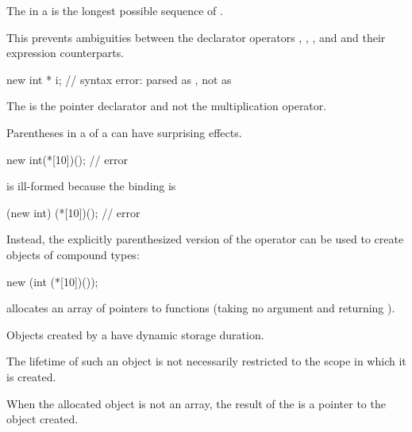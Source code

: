 \pnum
The  in a  is the longest
possible sequence of .
\begin{note}
This prevents ambiguities between the declarator operators \tcode{\&}, \tcode{\&\&},
\tcode{*}, and \tcode{[]} and their expression counterparts.
\end{note}
\begin{example}
\begin{codeblock}
new int * i;                    // syntax error: parsed as , not as 
\end{codeblock}
The \tcode{*} is the pointer declarator and not the multiplication
operator.
\end{example}

\pnum
\begin{note}
%
Parentheses in a  of a 
can have surprising effects.
\begin{example}
\begin{codeblock}
new int(*[10])();               // error
\end{codeblock}
is ill-formed because the binding is
\begin{codeblock}
(new int) (*[10])();            // error
\end{codeblock}

Instead, the explicitly parenthesized version of the 
operator can be used to create objects of compound
types:

\begin{codeblock}
new (int (*[10])());
\end{codeblock}
allocates an array of  pointers to functions (taking no
argument and returning ).
\end{example}
\end{note}

\pnum
{}%
Objects created by a  have dynamic storage
duration.
\begin{note}
%
The lifetime of such an object is not necessarily restricted to the
scope in which it is created.
\end{note}
When the allocated object is not an array, the result of the 
is a pointer to the object created.

